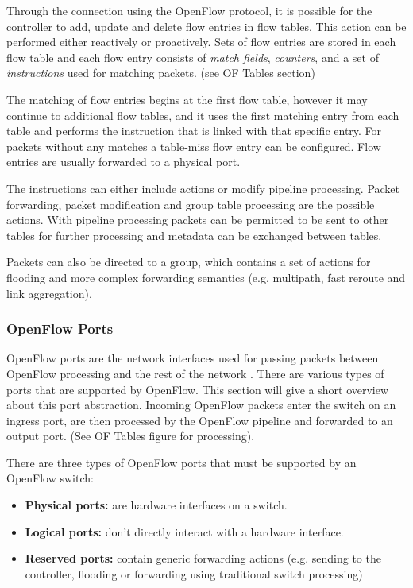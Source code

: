 Through the connection using the OpenFlow protocol, it is possible for the controller to add, update and delete flow entries in flow tables.  This action can be performed either reactively or proactively. Sets of flow entries are stored in each flow table and each flow entry consists of \textit{match fields}, \textit{counters}, and a set of \textit{instructions} used for matching packets. (see OF Tables section)

The matching of flow entries begins at the first flow table, however it may continue to additional flow tables, and it uses the first matching entry from each table and performs the instruction that is linked with that specific entry. For packets without any matches a table-miss flow entry can be configured. Flow entries are usually forwarded to a physical port.

The instructions can either include actions  or modify pipeline processing. Packet forwarding, packet modification and group table processing are the possible actions. With pipeline processing packets can be permitted to be sent to other tables for further processing and metadata can be exchanged between tables.

Packets can also be directed to a group, which contains a set of actions for flooding and more complex forwarding semantics (e.g. multipath, fast reroute and link aggregation).

\subsubsection{OpenFlow Ports}
OpenFlow ports are the network interfaces used for passing packets between OpenFlow processing and the rest of the network \cite{ofspecification}.
There are various types of ports that are supported by OpenFlow. This section will give a short overview about this port abstraction.
Incoming OpenFlow packets enter the switch on an ingress port, are then processed by the OpenFlow pipeline and forwarded to an output port. (See OF Tables figure for processing).

There are three types of OpenFlow ports that must be supported by an OpenFlow switch:
\begin{itemize}
\item \textbf{Physical ports:} are hardware interfaces on a switch.
\item \textbf{Logical ports:} don't directly interact  with a hardware interface.
\item \textbf{Reserved ports:} contain generic forwarding actions (e.g. sending to the controller, flooding or forwarding using traditional switch processing)
\end{itemize}

